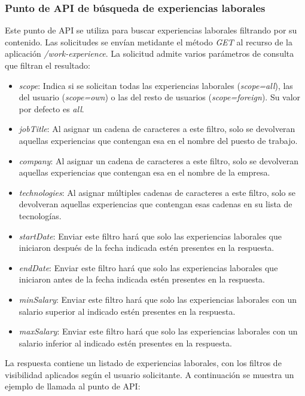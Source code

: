 \documentclass[a4paper, 12pt]{book}
\begin{document}
    \subsubsection{Punto de API de búsqueda de experiencias laborales}
    \label{subsec:get_work_experience}
    Este punto de API se utiliza para buscar experiencias laborales filtrando por su contenido.
    Las solicitudes se envían metidante el método \emph{GET} al recurso de la aplicación \emph{/work-experience}.
    La solicitud admite varios parámetros de consulta que filtran el resultado:
    \begin{itemize}
        \item \emph{scope}: Indica si se solicitan todas las experiencias laborales (\emph{scope=all}), las del usuario (\emph{scope=own}) o las del resto de usuarios (\emph{scope=foreign}).
        Su valor por defecto es \emph{all}.
        \item \emph{jobTitle}: Al asignar un cadena de caracteres a este filtro, solo se devolveran aquellas experiencias que contengan esa en el nombre del puesto de trabajo.
        \item \emph{company}: Al asignar un cadena de caracteres a este filtro, solo se devolveran aquellas experiencias que contengan esa en el nombre de la empresa.
        \item \emph{technologies}: Al asignar múltiples cadenas de caracteres a este filtro, solo se devolveran aquellas experiencias que contengan esas cadenas en su lista de tecnologías.
        \item \emph{startDate}: Enviar este filtro hará que solo las experiencias laborales que iniciaron después de la fecha indicada estén presentes en la respuesta.
        \item \emph{endDate}: Enviar este filtro hará que solo las experiencias laborales que iniciaron antes de la fecha indicada estén presentes en la respuesta.
        \item \emph{minSalary}: Enviar este filtro hará que solo las experiencias laborales con un salario superior al indicado estén presentes en la respuesta.
        \item \emph{maxSalary}: Enviar este filtro hará que solo las experiencias laborales con un salario inferior al indicado estén presentes en la respuesta.
    \end{itemize}
    La respuesta contiene un listado de experiencias laborales, con los filtros de visibilidad aplicados según el usuario solicitante.
    A continuación se muestra un ejemplo de llamada al punto de API:
\end{document}
